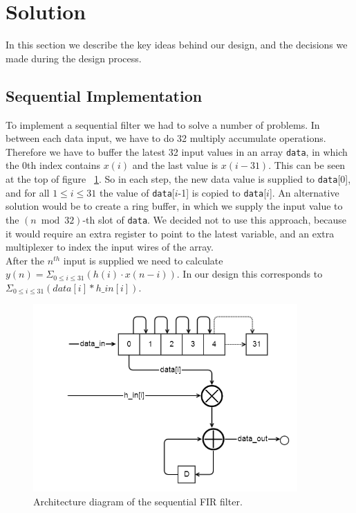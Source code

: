 \section{Solution}
In this section we describe the key ideas behind our design, and the decisions we made during the design process.
\subsection{Sequential Implementation}
To implement a sequential filter we had to solve a number of problems. In between each data input, we have to do 32 multiply accumulate operations. Therefore we have to buffer the latest 32 input values in an array \texttt{data}, in which the 0th index contains $x(i)$ and the last value is $x(i -31)$. This can be seen at the top of figure ~\ref{fig:architecture}. So in each step, the new data value is supplied to \texttt{data}[0], and for all $1 \leq i \leq 31$ the value of \texttt{data}[$i$-1] is copied to \texttt{data}[$i$]. An alternative solution would be to create a ring buffer, in which we supply the input value to the $(n\bmod 32)$-th slot of \texttt{data}. We decided not to use this approach, because it would require an extra register to point to the latest variable, and an extra multiplexer to index the input wires of the array.\\
After the $n^{th}$ input is supplied we need to calculate $y(n)=\Sigma_{0\leq i \leq 31}(h(i)\cdot x(n-i))$. In our design this corresponds to $\Sigma_{0 \leq i \leq 31}(data[i] * h\_in[i])$.  

\begin{figure}
\includegraphics[width=0.9\textwidth]{images/architecture.png}
\caption{Architecture diagram of the sequential FIR filter.}
\label{fig:architecture}
\end{figure}
